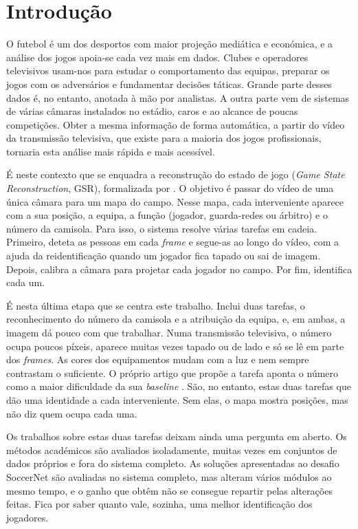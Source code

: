 \chapter{Introdução}\label{cap:introducao}

O futebol é um dos desportos com maior projeção mediática e económica, e a análise dos jogos apoia-se cada vez mais em dados. Clubes e operadores televisivos usam-nos para estudar o comportamento das equipas, preparar os jogos com os adversários e fundamentar decisões táticas. Grande parte desses dados é, no entanto, anotada à mão por analistas. A outra parte vem de sistemas de várias câmaras instalados no estádio, caros e ao alcance de poucas competições. Obter a mesma informação de forma automática, a partir do vídeo da transmissão televisiva, que existe para a maioria dos jogos profissionais, tornaria esta análise mais rápida e mais acessível.

É neste contexto que se enquadra a reconstrução do estado de jogo (\emph{Game State Reconstruction}, GSR), formalizada por \citet{somers2024soccernet}. O objetivo é passar do vídeo de uma única câmara para um mapa do campo. Nesse mapa, cada interveniente aparece com a sua posição, a equipa, a função (jogador, guarda-redes ou árbitro) e o número da camisola. Para isso, o sistema resolve várias tarefas em cadeia. Primeiro, deteta as pessoas em cada \emph{frame} e segue-as ao longo do vídeo, com a ajuda da reidentificação quando um jogador fica tapado ou sai de imagem. Depois, calibra a câmara para projetar cada jogador no campo. Por fim, identifica cada um.

É nesta última etapa que se centra este trabalho. Inclui duas tarefas, o reconhecimento do número da camisola e a atribuição da equipa, e, em ambas, a imagem dá pouco com que trabalhar. Numa transmissão televisiva, o número ocupa poucos píxeis, aparece muitas vezes tapado ou de lado e só se lê em parte dos \emph{frames}. As cores dos equipamentos mudam com a luz e nem sempre contrastam o suficiente. O próprio artigo que propõe a tarefa aponta o número como a maior dificuldade da sua \emph{baseline} \citep{somers2024soccernet}. São, no entanto, estas duas tarefas que dão uma identidade a cada interveniente. Sem elas, o mapa mostra posições, mas não diz quem ocupa cada uma.

Os trabalhos sobre estas duas tarefas deixam ainda uma pergunta em aberto. Os métodos académicos são avaliados isoladamente, muitas vezes em conjuntos de dados próprios e fora do sistema completo. As soluções apresentadas ao desafio SoccerNet são avaliadas no sistema completo, mas alteram vários módulos ao mesmo tempo, e o ganho que obtêm não se consegue repartir pelas alterações feitas. Fica por saber quanto vale, sozinha, uma melhor identificação dos jogadores.

